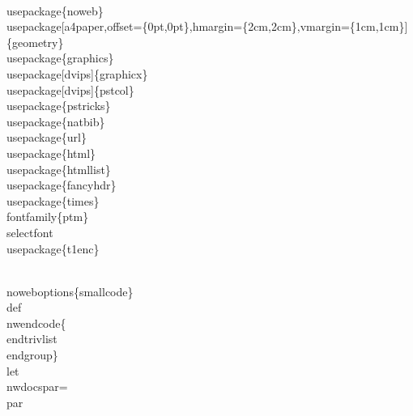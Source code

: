 \documentclass[11pt]{article}
\def\nwendcode{\endtrivlist \endgroup} %
\let\nwdocspar=\par                    %
\begin{document}
\nwenddocs{}\endmoddef
\\usepackage\{noweb\}
\\usepackage[a4paper,offset=\{0pt,0pt\},hmargin=\{2cm,2cm\},vmargin=\{1cm,1cm\}]\{geometry\}
\\usepackage\{graphics\}
\\usepackage[dvips]\{graphicx\}
\\usepackage[dvips]\{pstcol\}
\\usepackage\{pstricks\}
\\usepackage\{natbib\}
\\usepackage\{url\}
\\usepackage\{html\}     
\\usepackage\{htmllist\} 
\\usepackage\{fancyhdr\} %
\\usepackage\{times\}\\fontfamily\{ptm\}\\selectfont
\\usepackage\{t1enc\}

\\noweboptions\{smallcode\}
\\def\\nwendcode\{\\endtrivlist \\endgroup\} %
\\let\\nwdocspar=\\par                    %
\end{document}
